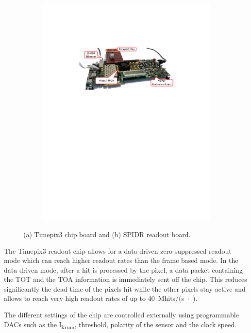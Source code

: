 \begin{figure}[htbp]
\begin{subfigure}[b]{0.65\textwidth}
    \includegraphics[width=\textwidth]{./figures/Calibration/SPIDRboard}
    \caption{}
  \end{subfigure}
  \caption{(a) Timepix3 chip board and (b) SPIDR readout board.}
  \label{fig:Timepix3board_SPIDR}
\end{figure}

The Timepix3 readout chip allows for a data-driven zero-suppressed
readout mode which can reach higher readout rates than the frame based
mode. In the data driven mode, after a hit is processed by the pixel,
a data packet containing the TOT and the TOA information is
immediately sent off the chip. This reduces significantly the dead
time of the pixels hit while the other pixels stay active and allows
to reach very high readout rates of up to
40~Mhits/(s~$\cdot$~\cmsquared).

The different settings of the chip are controlled externally using
programmable DACs such as the I\textsubscript{krum}, threshold,
polarity of the sensor and the clock speed.

